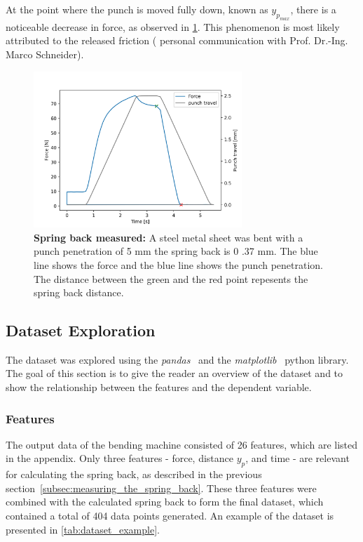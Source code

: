 {At the point where the punch is moved fully down, known as $y_p_{max}$, there is a noticeable decrease in force, as
observed in \cref{fig:springback_measured}. This phenomenon is most likely attributed to the released friction (
personal communication with Prof. Dr.-Ing. Marco Schneider).

\begin{figure}[H]
    \begin{tcolorbox}[arc=0pt,boxrule=0.5pt]
        \centering
        \includegraphics[width=0.7\textwidth]{chap4/images/springback_measured}
    \end{tcolorbox}
    \caption{\textbf{Spring back measured:} A steel metal sheet was bent with a punch penetration of 5
    mm the spring back is 0 .37 mm. The blue line shows the force and the blue line shows the punch penetration.
    The distance between the green and the red point repesents the spring back distance.}
    \label{fig:springback_measured}
\end{figure}

\subsection{Dataset Exploration}\label{subsec:dataset-exploration}
The dataset was explored using the \textit{pandas}~\cite{mckinney-proc-scipy-2010}
and the \textit{matplotlib}~\cite{Hunter:2007} python library.
The goal of this section is to give the reader an overview of the dataset and
to show the relationship between the features and the dependent variable.

\subsubsection{Features}
The output data of the bending machine consisted of 26 features, which are listed in
the appendix.
Only three features - force, distance $y_p$, and time - are relevant for
calculating the spring back, as described in the previous section~\ref{subsec:measuring_the_spring_back}.
These three features were combined with the calculated spring back to form the final
dataset, which contained a total of 404 data points generated.
An example of the dataset is presented in \cref{tab:dataset_example}.

}
